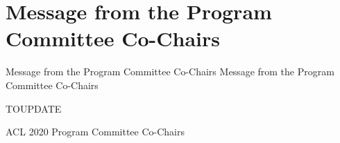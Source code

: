 \section{Message from the Program Committee Co-Chairs}\vspace{2em}
\setheaders%
    {Message from the Program Committee Co-Chairs}%
    {Message from the Program Committee Co-Chairs}
\thispagestyle{emptyheader}

\setlength{\parskip}{.7ex}

TOUPDATE


\vspace{1.0em}
\noindent ACL 2020 Program Committee Co-Chairs \\
